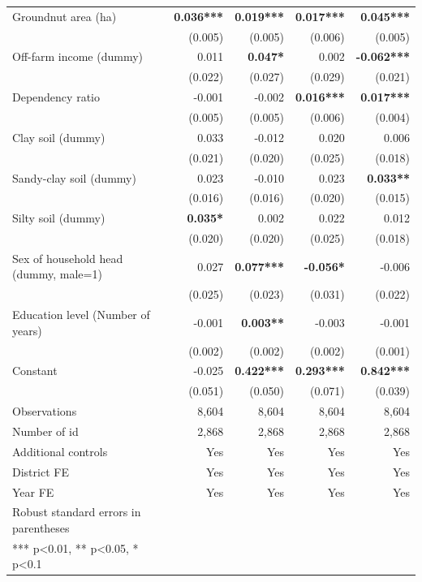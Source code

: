 \documentclass[
]{article}
\begin{document}
\begin{longtable}[t]{lrrrr}
Groundnut area (ha) & \textbf{0.036***} & \textbf{0.019***} & \textbf{0.017***} & \textbf{0.045***}\\
 & (0.005) & (0.005) & (0.006) & (0.005)\\
Off-farm income (dummy) & 0.011 & \textbf{0.047*} & 0.002 & \textbf{-0.062***}\\
 & (0.022) & (0.027) & (0.029) & (0.021)\\
Dependency ratio & -0.001 & -0.002 & \textbf{0.016***} & \textbf{0.017***}\\
 & (0.005) & (0.005) & (0.006) & (0.004)\\
Clay soil (dummy) & 0.033 & -0.012 & 0.020 & 0.006\\
 & (0.021) & (0.020) & (0.025) & (0.018)\\
Sandy-clay soil (dummy) & 0.023 & -0.010 & 0.023 & \textbf{0.033**}\\
 & (0.016) & (0.016) & (0.020) & (0.015)\\
Silty soil (dummy) & \textbf{0.035*} & 0.002 & 0.022 & 0.012\\
 & (0.020) & (0.020) & (0.025) & (0.018)\\
Sex of household head (dummy, male=1) & 0.027 & \textbf{0.077***} & \textbf{-0.056*} & -0.006\\
 & (0.025) & (0.023) & (0.031) & (0.022)\\
Education level (Number of years) & -0.001 & \textbf{0.003**} & -0.003 & -0.001\\
 & (0.002) & (0.002) & (0.002) & (0.001)\\
Constant & -0.025 & \textbf{0.422***} & \textbf{0.293***} & \textbf{0.842***}\\
 & (0.051) & (0.050) & (0.071) & (0.039)\\
\midrule
Observations & 8,604 & 8,604 & 8,604 & 8,604\\
Number of id & 2,868 & 2,868 & 2,868 & 2,868\\
Additional controls & Yes & Yes & Yes & Yes\\
District FE & Yes & Yes & Yes & Yes\\
Year FE & Yes & Yes & Yes & Yes\\
\midrule
Robust standard errors in parentheses &  &  &  & \\
*** p<0.01, ** p<0.05, * p<0.1 &  &  &  & \\*
\end{longtable}
\endgroup{}

\newpage

\begingroup\fontsize{7}{9}\selectfont
\end{document}
